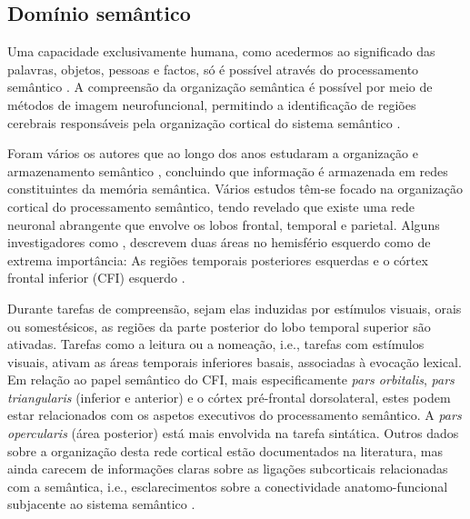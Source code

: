 \documentclass[output=paper,colorlinks,citecolor=brown,booklanguage=portuguese]{langscibook}
\begin{document}
\subsection{Domínio semântico}

Uma capacidade exclusivamente humana, como acedermos ao significado das palavras, objetos, pessoas e factos, só é possível através do processamento semântico \citep{MoritzGasser2013a}. A compreensão da organização semântica é possível por meio de métodos de imagem neurofuncional, permitindo a identificação de regiões cerebrais responsáveis pela organização cortical do sistema semântico \citep{Duffau2005}. 

Foram vários os autores que ao longo dos anos estudaram a organização e armazenamento semântico \citep{Baldo2006, Bello2008, Bello2007, Bertani2009, Coello2013, Witte2015a, Duffau2005, Friederici2009, Gill2015, Huth2016, Lubrano2014, MoritzGasser2013a, Patterson2007, Richardson2011}, concluindo que informação é armazenada em redes constituintes da memória semântica. Vários estudos têm-se focado na organização cortical do processamento semântico, tendo revelado que existe uma rede neuronal abrangente que envolve os lobos frontal, temporal e parietal. Alguns investigadores como \citet{Duffau2005}, descrevem duas áreas no hemisfério esquerdo como de extrema importância: As regiões temporais posteriores esquerdas e o córtex frontal inferior (CFI) esquerdo \citep{Duffau2005}.

Durante tarefas de compreensão, sejam elas induzidas por estímulos visuais, orais ou somestésicos, as regiões da parte posterior do lobo temporal superior são ativadas. Tarefas como a leitura ou a nomeação, i.e., tarefas com estímulos visuais, ativam as áreas temporais inferiores basais, associadas à evocação lexical. Em relação ao papel semântico do CFI, mais especificamente \emph{pars orbitalis}, \emph{pars triangularis} (inferior e anterior) e o córtex pré-frontal dorsolateral, estes podem estar relacionados com os aspetos executivos do processamento semântico. A \emph{pars opercularis} (área posterior) está mais envolvida na tarefa sintática. Outros dados sobre a organização desta rede cortical estão documentados na literatura, mas ainda carecem de informações claras sobre as ligações subcorticais relacionadas com a semântica, i.e., esclarecimentos sobre a conectividade anatomo-funcional subjacente ao sistema semântico \citep{Duffau2005}.  
\end{document}
